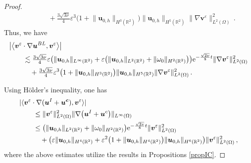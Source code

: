 \documentclass[pdflatex,sn-mathphys-num]{sn-jnl}%
\theoremstyle{thmstyleone}%
\theoremstyle{thmstyletwo}%
\theoremstyle{thmstylethree}%
\theoremstyle{thmstyletwo}
\begin{document}
\begin{proof}
\begin{align*}
		&\qquad\quad+\tfrac{3\sqrt{3\nu}}{4}\varepsilon^3
		\big(
		1+
		\lVert {\boldsymbol{u}}_{0,h} \rVert_{H^{3}(\mathbb{R}^2)}
		\big)
		\lVert {\boldsymbol{u}}_{0,h} \rVert_{H^{5}(\mathbb{R}^2)}
		\lVert\nabla{\boldsymbol v}^{\varepsilon}\rVert^2_{{L}^2(\Omega)}\,.
	\end{align*}
	Thus, we have
	\begin{align}\label{4.6}
		&\big|\big\langle{\boldsymbol v}^{\varepsilon} \cdot \nabla
		\boldsymbol{u}^{BL},{\boldsymbol v}^{\varepsilon}\big\rangle\big|\notag\\
		&\qquad\lesssim
		\tfrac{3\sqrt{3\nu}}{4}
		\varepsilon
		\big(
		\lVert{\boldsymbol{u}}_{0,h}\rVert_{L^\infty(\mathbb{R}^2)} 
		+\varepsilon\big(
		\lVert{\boldsymbol{u}}_{0,h}\rVert_{L^2(\mathbb{R}^2)}+\lVert{\omega}_0\rVert_{H^2(\mathbb{R}^2)}
		\big)
		\big)\mathrm{e}^{-\frac{\sqrt{2\nu}}{8}  t}
		\lVert\nabla{\boldsymbol v}^{\varepsilon}\rVert^2_{{L}^2(\Omega)}
		\notag\\
		&\qquad\quad+\tfrac{3\sqrt{3\nu}}{4}\varepsilon^3
		\big(
		1+
		\lVert {\boldsymbol{u}}_{0,h} \rVert_{H^{3}(\mathbb{R}^2)}
		\big)
		\lVert {\boldsymbol{u}}_{0,h} \rVert_{H^{5}(\mathbb{R}^2)}
		\lVert\nabla{\boldsymbol v}^{\varepsilon}\rVert^2_{{L}^2(\Omega)}\,.
	\end{align}
	
	
	
	Using H\"{o}lder's inequality, one has
	\begin{align}\label{4.7}
		&|\langle{\boldsymbol v}^{\varepsilon} \cdot \nabla
		(
		\boldsymbol{u}^I+
		\boldsymbol{u^c}
		),{\boldsymbol v}^{\varepsilon}\rangle|\notag\\
		&\qquad\leq\lVert {\boldsymbol v}^{\varepsilon} \rVert^2_{{L}^2(\Omega)}
		\lVert \nabla
		\big(
		\boldsymbol u^{I}+\boldsymbol u^{c}
		\big)
		\rVert_{{L}^\infty(\Omega)}
		\notag\\
		&\qquad\leq
		\big(
		\lVert{\boldsymbol{u}}_{0,h}\rVert_{L^2(\mathbb{R}^2)}+\lVert{\omega}_0\rVert_{H^2(\mathbb{R}^2)}
		\big)\mathrm{e}^{-\frac{\sqrt{2\nu}}{8}  t}\lVert {\boldsymbol v}^{\varepsilon} \rVert^2_{{L}^2(\Omega)}
		\notag\\
		&\qquad\quad+\big(\varepsilon
		\lVert {\boldsymbol{u}}_{0,h} \rVert_{H^{4}(\mathbb{R}^2)}
		+\varepsilon^2
		\big(
		1+
		\lVert {\boldsymbol{u}}_{0,h} \rVert_{H^{4}(\mathbb{R}^2)}
		\big)
		\lVert {\boldsymbol{u}}_{0,h} \rVert_{H^{6}(\mathbb{R}^2)}\big)\lVert {\boldsymbol v}^{\varepsilon} \rVert^2_{{L}^2(\Omega)}
		\,,
	\end{align}
	where the above estimates utilize the results in Propositions \ref{propIC}.
	

\end{proof}
\end{document}

